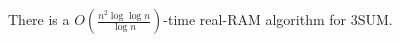 \begin{theorem}
	There is a $O(\frac{n^2 \log \log n}{\log n})$-time real-RAM algorithm
for 3SUM\@.%
\end{theorem}
